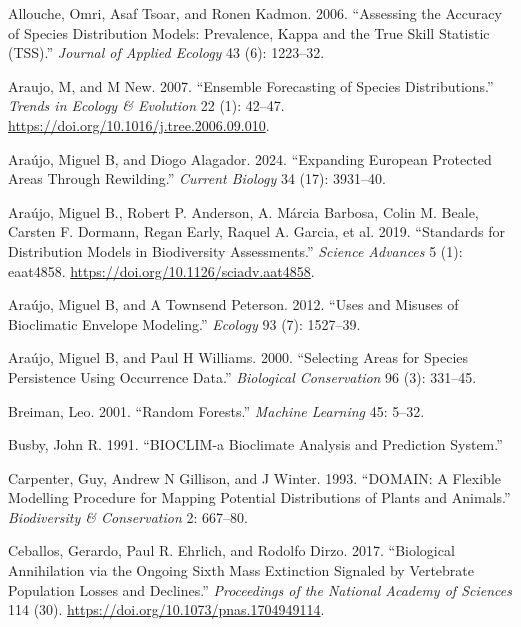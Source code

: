 \documentclass[
]{article}
\newlength{\cslhangindent}
\newenvironment{CSLReferences}[2] %
 {\begin{list}{}{%
  \setlength{\itemindent}{0pt}
  \setlength{\leftmargin}{0pt}
  \setlength{\parsep}{0pt}
  \ifodd #1
   \setlength{\leftmargin}{\cslhangindent}
   \setlength{\itemindent}{-1\cslhangindent}
  \fi
  \setlength{\itemsep}{#2\baselineskip}}}
 {\end{list}}
\begin{document}
\label{refs}
\begin{CSLReferences}{1}{0}
Allouche, Omri, Asaf Tsoar, and Ronen Kadmon. 2006. {``Assessing the
Accuracy of Species Distribution Models: Prevalence, Kappa and the True
Skill Statistic (TSS).''} \emph{Journal of Applied Ecology} 43 (6):
1223--32.

Araujo, M, and M New. 2007. {``Ensemble Forecasting of Species
Distributions.''} \emph{Trends in Ecology \& Evolution} 22 (1): 42--47.
\url{https://doi.org/10.1016/j.tree.2006.09.010}.

Araújo, Miguel B, and Diogo Alagador. 2024. {``Expanding European
Protected Areas Through Rewilding.''} \emph{Current Biology} 34 (17):
3931--40.

Araújo, Miguel B., Robert P. Anderson, A. Márcia Barbosa, Colin M.
Beale, Carsten F. Dormann, Regan Early, Raquel A. Garcia, et al. 2019.
{``Standards for Distribution Models in Biodiversity Assessments.''}
\emph{Science Advances} 5 (1): eaat4858.
\url{https://doi.org/10.1126/sciadv.aat4858}.

Araújo, Miguel B, and A Townsend Peterson. 2012. {``Uses and Misuses of
Bioclimatic Envelope Modeling.''} \emph{Ecology} 93 (7): 1527--39.

Araújo, Miguel B, and Paul H Williams. 2000. {``Selecting Areas for
Species Persistence Using Occurrence Data.''} \emph{Biological
Conservation} 96 (3): 331--45.

Breiman, Leo. 2001. {``Random Forests.''} \emph{Machine Learning} 45:
5--32.

Busby, John R. 1991. {``BIOCLIM-a Bioclimate Analysis and Prediction
System.''}

Carpenter, Guy, Andrew N Gillison, and J Winter. 1993. {``DOMAIN: A
Flexible Modelling Procedure for Mapping Potential Distributions of
Plants and Animals.''} \emph{Biodiversity \& Conservation} 2: 667--80.

Ceballos, Gerardo, Paul R. Ehrlich, and Rodolfo Dirzo. 2017.
{``Biological Annihilation via the Ongoing Sixth Mass Extinction
Signaled by Vertebrate Population Losses and Declines.''}
\emph{Proceedings of the National Academy of Sciences} 114 (30).
\url{https://doi.org/10.1073/pnas.1704949114}.


\end{CSLReferences}
\end{document}
